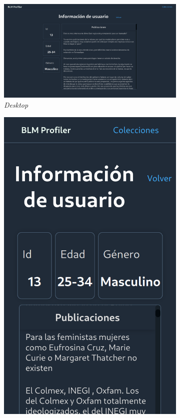 \begin{figure}[H]
  \centering
  \begin{subfigure}{0.7\textwidth}
   \includegraphics[width=\textwidth]{imaxes/capturas-app/desktop/info-usuario.png}
  \caption{\textit{Desktop}} 
  \end{subfigure}
  \begin{subfigure}{0.223\textwidth}
   \includegraphics[width=\textwidth]{imaxes/capturas-app/mobile/info-usuario.png}

\end{subfigure}
\end{figure}
